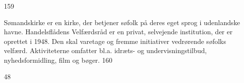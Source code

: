 159

Sømandskirke er en kirke, der betjener søfolk på deres eget sprog i
udenlandske havne. Handelsflådens Velfærdsråd er en privat, selvejende
institution, der er oprettet i 1948. Den skal varetage og fremme
initiativer vedrørende søfolks velfærd. Aktiviteterne omfatter bl.a.
idræts- og undervisningstilbud, nyhedsformidling, film og bøger. 160

48
